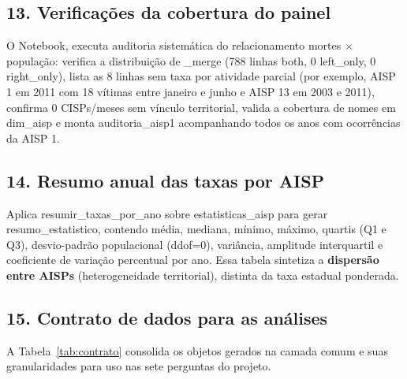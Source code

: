 \documentclass[11pt,a4paper]{article}
\newcommand{\code}[1]{{\ttfamily\footnotesize\allowbreak #1}}
\begin{document}
\subsection{13. Verificações da cobertura do painel}
O Notebook, executa auditoria sistemática do relacionamento mortes $\times$ população: verifica a distribuição de \code{\_merge} (788 linhas \code{both}, 0 \code{left\_only}, 0 \code{right\_only}), lista as 8 linhas sem taxa por atividade parcial (por exemplo, AISP 1 em 2011 com 18 vítimas entre janeiro e junho e AISP 13 em 2003 e 2011), confirma 0 CISPs/meses sem vínculo territorial, valida a cobertura de nomes em \code{dim\_aisp} e monta \code{auditoria\_aisp1} acompanhando todos os anos com ocorrências da AISP 1.

\subsection{14. Resumo anual das taxas por AISP}
Aplica \code{resumir\_taxas\_por\_ano} sobre \code{estatisticas\_aisp} para gerar \code{resumo\_estatistico}, contendo média, mediana, mínimo, máximo, quartis (Q1 e Q3), desvio-padrão populacional (\code{ddof=0}), variância, amplitude interquartil e coeficiente de variação percentual por ano. Essa tabela sintetiza a \textbf{dispersão entre AISPs} (heterogeneidade territorial), distinta da taxa estadual ponderada.

\subsection{15. Contrato de dados para as análises}
A Tabela~\ref{tab:contrato} consolida os objetos gerados na camada comum e suas granularidades para uso nas sete perguntas do projeto.
\end{document}
